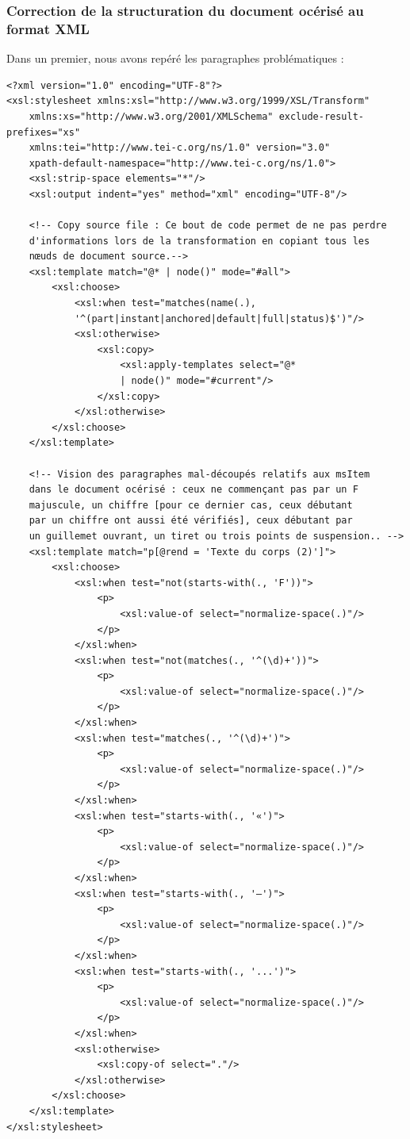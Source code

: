 \documentclass[a4paper,12pt,twoside]{book}
\begin{document}
    
    \subsubsection{\label{correction_doc_ocerise}Correction de la structuration du document océrisé au format XML}
    
    Dans un premier, nous avons repéré les paragraphes problématiques :
    
    \begin{verbatim}
<?xml version="1.0" encoding="UTF-8"?>
<xsl:stylesheet xmlns:xsl="http://www.w3.org/1999/XSL/Transform"
    xmlns:xs="http://www.w3.org/2001/XMLSchema" exclude-result-prefixes="xs"
    xmlns:tei="http://www.tei-c.org/ns/1.0" version="3.0"
    xpath-default-namespace="http://www.tei-c.org/ns/1.0">
    <xsl:strip-space elements="*"/>
    <xsl:output indent="yes" method="xml" encoding="UTF-8"/>

    <!-- Copy source file : Ce bout de code permet de ne pas perdre 
    d'informations lors de la transformation en copiant tous les 
    nœuds de document source.-->
    <xsl:template match="@* | node()" mode="#all">
        <xsl:choose>
            <xsl:when test="matches(name(.), 
            '^(part|instant|anchored|default|full|status)$')"/>
            <xsl:otherwise>
                <xsl:copy>
                    <xsl:apply-templates select="@* 
                    | node()" mode="#current"/>
                </xsl:copy>
            </xsl:otherwise>
        </xsl:choose>
    </xsl:template>

    <!-- Vision des paragraphes mal-découpés relatifs aux msItem 
    dans le document océrisé : ceux ne commençant pas par un F 
    majuscule, un chiffre [pour ce dernier cas, ceux débutant 
    par un chiffre ont aussi été vérifiés], ceux débutant par 
    un guillemet ouvrant, un tiret ou trois points de suspension.. -->
    <xsl:template match="p[@rend = 'Texte du corps (2)']">
        <xsl:choose>
            <xsl:when test="not(starts-with(., 'F'))">
                <p>
                    <xsl:value-of select="normalize-space(.)"/>
                </p>
            </xsl:when>
            <xsl:when test="not(matches(., '^(\d)+'))">
                <p>
                    <xsl:value-of select="normalize-space(.)"/>
                </p>
            </xsl:when>
            <xsl:when test="matches(., '^(\d)+')">
                <p>
                    <xsl:value-of select="normalize-space(.)"/>
                </p>
            </xsl:when>
            <xsl:when test="starts-with(., '«')">
                <p>
                    <xsl:value-of select="normalize-space(.)"/>
                </p>
            </xsl:when>
            <xsl:when test="starts-with(., '—')">
                <p>
                    <xsl:value-of select="normalize-space(.)"/>
                </p>
            </xsl:when>
            <xsl:when test="starts-with(., '...')">
                <p>
                    <xsl:value-of select="normalize-space(.)"/>
                </p>
            </xsl:when>
            <xsl:otherwise>
                <xsl:copy-of select="."/>
            </xsl:otherwise>
        </xsl:choose>
    </xsl:template>
</xsl:stylesheet>
    \end{verbatim}
    
\end{document}
